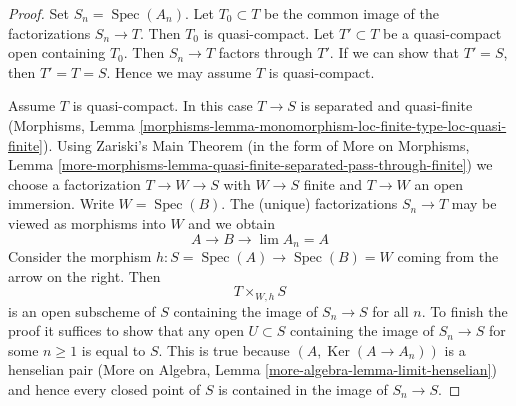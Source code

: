 \documentclass[10pt,a4paper]{amsart}
\theoremstyle{plain}
\theoremstyle{definition}
\theoremstyle{remark}
\numberwithin{equation}{subsection}
\def\lim{\mathop{\mathrm{lim}}\nolimits}
\def\Spec{\mathop{\mathrm{Spec}}}
\def\Ker{\mathop{\mathrm{Ker}}}
\begin{document}
\begin{proof}
Set $S_n = \Spec(A_n)$. Let $T_0 \subset T$ be the common
image of the factorizations $S_n \to T$. Then $T_0$ is quasi-compact.
Let $T' \subset T$ be a quasi-compact open containing $T_0$.
Then $S_n \to T$ factors through $T'$.
If we can show that $T' = S$, then $T' = T = S$.
Hence we may assume $T$ is quasi-compact.

\medskip\noindent
Assume $T$ is quasi-compact.
In this case $T \to S$ is separated and quasi-finite
(Morphisms, Lemma
\ref{morphisms-lemma-monomorphism-loc-finite-type-loc-quasi-finite}).
Using Zariski's Main Theorem
(in the form of More on Morphisms, Lemma
\ref{more-morphisms-lemma-quasi-finite-separated-pass-through-finite})
we choose a factorization $T \to W \to S$ with $W \to S$ finite
and $T \to W$ an open immersion. Write $W = \Spec(B)$.
The (unique) factorizations $S_n \to T$ may be viewed
as morphisms into $W$ and we obtain
$$
A \longrightarrow B \longrightarrow \lim A_n = A
$$
Consider the morphism $h : S = \Spec(A) \to \Spec(B) = W$ coming
from the arrow on the right. Then
$$
T \times_{W, h} S
$$
is an open subscheme of $S$ containing the image of $S_n \to S$ for all $n$.
To finish the proof it suffices to show that any open $U \subset S$
containing the image of $S_n \to S$ for some $n \geq 1$ is equal to $S$.
This is true because $(A, \Ker(A \to A_n))$ is a henselian pair
(More on Algebra, Lemma \ref{more-algebra-lemma-limit-henselian})
and hence every closed point of $S$ is contained in the image of $S_n \to S$.
\end{proof}
\end{document}
